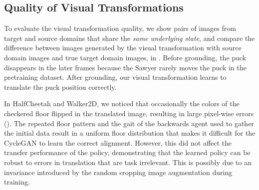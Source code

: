 


\subsection{Quality of Visual Transformations}

To evaluate the visual transformation quality, we show pairs of images from target and source domains that share the \textit{same underlying state}, and compare the difference between images generated by the visual transformation with source domain images and true target domain images, in . Before grounding, the puck disappears in the later frames because the Sawyer rarely moves the puck in the pretraining dataset.  After grounding, our visual transformation learns to translate the puck position correctly. 

In HalfCheetah and Walker2D, we noticed that occasionally the colors of the checkered floor flipped in the translated image, resulting in large pixel-wise errors ().  The repeated floor pattern and the gait of the backwards agent used to gather the initial data result in a uniform floor distribution that makes it difficult for the CycleGAN to learn the correct alignment.  However, this did not affect the transfer performance of the policy, demonstrating that the learned policy can be robust to errors in translation that are task irrelevant.  This is possibly due to an invariance introduced by the random cropping image augmentation during training.  

